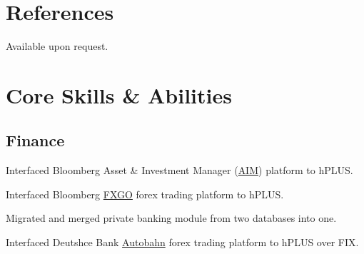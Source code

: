 \documentclass[11pt,a4paper,sans]{moderncv}        %
\begin{document}
\section{References}
Available upon request.

\nocite{*}



\clearpage
\iffalse

\section{Core Skills \& Abilities}
\subsection{Finance}

\item Interfaced Bloomberg Asset \& Investment Manager (\href{http://www.bloomberg.com/trading-solutions/buy-side/}{AIM}) platform to hPLUS.
\item Interfaced Bloomberg \href{http://www.bloomberg.com/professional/foreign-exchange/}{FXGO} forex trading platform to hPLUS.
\item Migrated and merged private banking module from two databases into one.
\item Interfaced Deutshce Bank \href{https://autobahn.db.com/microSite/html/fx.html}{Autobahn} forex trading platform to hPLUS over FIX.
\end{document}
